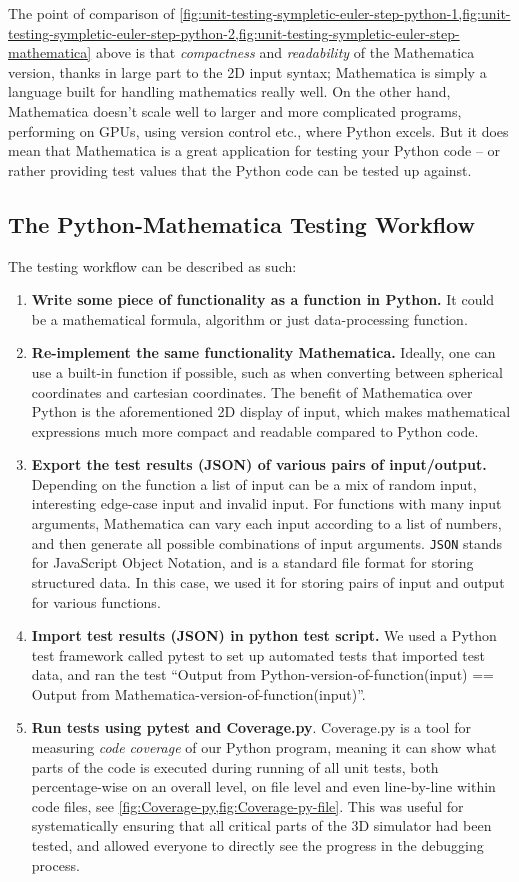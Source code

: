 The point of comparison of \cref{fig:unit-testing-sympletic-euler-step-python-1,fig:unit-testing-sympletic-euler-step-python-2,fig:unit-testing-sympletic-euler-step-mathematica} above is that \emph{compactness} and \emph{readability} of the Mathematica version, thanks in large part to the 2D input syntax; Mathematica is simply a language built for handling mathematics really well. On the other hand, Mathematica doesn't scale well to larger and more complicated programs, performing on GPUs, using version control etc., where Python excels. But it does mean that Mathematica is a great application for testing your Python code – or rather providing test values that the Python code can be tested up against.

\subsection{The Python-Mathematica Testing Workflow}

The testing workflow can be described as such:

\begin{enumerate}
	\item \textbf{Write some piece of functionality as a function in Python.} It could be a mathematical formula, algorithm or just data-processing function.
	\item \textbf{Re-implement the same functionality Mathematica.} Ideally, one can use a built-in function if possible, such as when converting between spherical coordinates and cartesian coordinates. The benefit of Mathematica over Python is the aforementioned 2D display of input, which makes mathematical expressions much more compact and readable compared to Python code.
	\item \textbf{Export the test results (JSON) of various pairs of input/output.} Depending on the function a list of input can be a mix of random input, interesting edge-case input and invalid input. For functions with many input arguments, Mathematica can vary each input according to a list of numbers, and then generate all possible combinations of input arguments. \texttt{JSON} stands for JavaScript Object Notation, and is a standard file format for storing structured data. In this case, we used it for storing pairs of input and output for various functions.
	\item \textbf{Import test results (JSON) in python test script.} We used a Python test framework called pytest to set up automated tests that imported test data, and ran the test ``Output from Python-version-of-function(input) == Output from Mathematica-version-of-function(input)''.
	\item \textbf{Run tests using pytest and Coverage.py}. Coverage.py is a tool for measuring \emph{code coverage} of our Python program, meaning it can show what parts of the code is executed during running of all unit tests, both percentage-wise on an overall level, on file level and even line-by-line within code files, see \cref{fig:Coverage-py,fig:Coverage-py-file}. This was useful for systematically ensuring that all critical parts of the 3D simulator had been tested, and allowed everyone to directly see the progress in the debugging process.
\end{enumerate}


